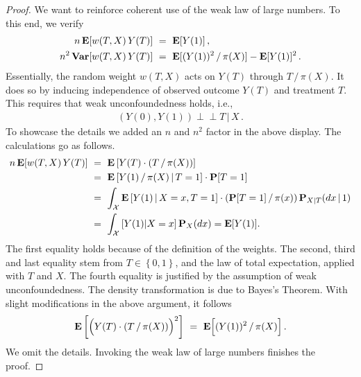 \begin{proof}
We want to reinforce coherent use of the weak law of large numbers.
To this end, we verify 
\begin{align*}
  n\,\E[w(T,X)\,Y(T)]
  \ 
  &=
  \ 
  \E[Y(1)]
  \,,
  \\
  n^2\,
  \mathbf{Var}[w(T,X)\,Y(T)]
  \ 
  &=
  \ 
    \E[
    (
      Y(1)
    )^2
    \,/\,
    \pi(X)
    ]
    -
    \E[Y(1)]^2
    \,.
\end{align*}
Essentially, the random weight $w(T,X)$ acts on $Y(T)$ through $T\,/\,\pi(X)$.
It does so by inducing independence of observed outcome $Y(T)$ and treatment $T$.
This requires that weak unconfoundedness holds, i.e., 
\begin{gather}
  (Y(0),Y(1))\perp\!\!\!\perp T\, |\, X\,.
\end{gather}
To showcase the details we added an $n$ and $n^2$ factor in the above display.
The calculations go as follows.
\begin{align}
  \begin{split}
  n\,\E[w(T,X)\,Y(T)]
  &\ 
  =
  \ 
  \E
  \left[ 
    Y(T)
    \cdot
    (T\,/\,\pi(X))
  \right]
  \\
  &\ =\ 
  \E
  \left[ 
    Y(1)
    \,
    /
    \,
    \pi(X)
    \,
    \vert
    \,
    T=1
  \right]
  \cdot
  \P[T=1]
  \\
  &\ =\ 
  \int_\mathcal{X}
  \E
  \left[ 
    Y(1)
    \,
    \vert
    \,
    X=x
    ,
    T=1
  \right]
  \cdot
  (
  \P[T=1]
  \,
  /
  \,
  \pi(x)
  )
  \,
  \P_{X|T}(dx\,|\,1)
  \\
  &\ =\ 
  \int_\mathcal{X}
  \left[ 
    Y(1)
    \vert
    X=x
  \right]
  \P_X(dx)
  =
  \E[Y(1)]
  .
\end{split}
\end{align}
The first equality holds because of the definition of the weights.
The second, third and last equality stem from 
$
  T\in \left\{ 0,1 \right\}
$,
and the law of total expectation, applied with $T$ and $X$.
The fourth equality is justified by the assumption of weak unconfoundedness.
The density transformation is due to Bayes's Theorem.
With slight modifications in the above argument, it follows
\begin{gather}
  \E
  \left[ 
  \Big( 
    Y(T)
    \cdot
    (T\,/\,\pi(X))
  \Big)
  ^2
  \right]
  \ 
    =
    \ 
    \E
    \Big[
    (Y(1))^2
    \,
    /
    \,
    \pi(X)
    \Big]
    \,.
\end{gather}
We omit the details.
Invoking the weak law of large numbers finishes the proof.
\end{proof}

